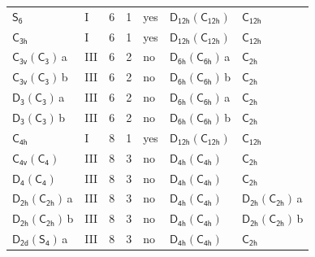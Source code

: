 \documentclass[10pt,a4paper]{article}
\numberwithin{equation}{section}
\newcommand{\grp}[1]{\mathsf{#1}}
\newcommand{\clsletter}[1]{\,{\scriptsize\color{black!55}#1}}
\begin{document}
{\begin{longtable}{@{}llrrlll@{}}
\href{../../../rotation/data/pdf/S6.pdf}{$\grp{S_{6}}$} & I & 6 & 1 & yes & \href{D12h-C12h.pdf}{$\grp{D_{12h}}(\grp{C_{12h}})$} & \href{../../../rotation/data/pdf/C12h.pdf}{$\grp{C_{12h}}$}\\
\href{../../../rotation/data/pdf/C3h.pdf}{$\grp{C_{3h}}$} & I & 6 & 1 & yes & \href{D12h-C12h.pdf}{$\grp{D_{12h}}(\grp{C_{12h}})$} & \href{../../../rotation/data/pdf/C12h.pdf}{$\grp{C_{12h}}$}\\
\href{C3v-C3.pdf}{$\grp{C_{3v}}(\grp{C_{3}})$}\clsletter{a} & III & 6 & 2 & no & \href{D6h-C6h.pdf}{$\grp{D_{6h}}(\grp{C_{6h}})$}\clsletter{a} & \href{../../../rotation/data/pdf/C2h.pdf}{$\grp{C_{2h}}$}\\
\href{C3v-C3.pdf}{$\grp{C_{3v}}(\grp{C_{3}})$}\clsletter{b} & III & 6 & 2 & no & \href{D6h-C6h.pdf}{$\grp{D_{6h}}(\grp{C_{6h}})$}\clsletter{b} & \href{../../../rotation/data/pdf/C2h.pdf}{$\grp{C_{2h}}$}\\
\href{D3-C3.pdf}{$\grp{D_{3}}(\grp{C_{3}})$}\clsletter{a} & III & 6 & 2 & no & \href{D6h-C6h.pdf}{$\grp{D_{6h}}(\grp{C_{6h}})$}\clsletter{a} & \href{../../../rotation/data/pdf/C2h.pdf}{$\grp{C_{2h}}$}\\
\href{D3-C3.pdf}{$\grp{D_{3}}(\grp{C_{3}})$}\clsletter{b} & III & 6 & 2 & no & \href{D6h-C6h.pdf}{$\grp{D_{6h}}(\grp{C_{6h}})$}\clsletter{b} & \href{../../../rotation/data/pdf/C2h.pdf}{$\grp{C_{2h}}$}\\
\href{../../../rotation/data/pdf/C4h.pdf}{$\grp{C_{4h}}$} & I & 8 & 1 & yes & \href{D12h-C12h.pdf}{$\grp{D_{12h}}(\grp{C_{12h}})$} & \href{../../../rotation/data/pdf/C12h.pdf}{$\grp{C_{12h}}$}\\
\href{C4v-C4.pdf}{$\grp{C_{4v}}(\grp{C_{4}})$} & III & 8 & 3 & no & \href{D4h-C4h.pdf}{$\grp{D_{4h}}(\grp{C_{4h}})$} & \href{../../../rotation/data/pdf/C2h.pdf}{$\grp{C_{2h}}$}\\
\href{D4-C4.pdf}{$\grp{D_{4}}(\grp{C_{4}})$} & III & 8 & 3 & no & \href{D4h-C4h.pdf}{$\grp{D_{4h}}(\grp{C_{4h}})$} & \href{../../../rotation/data/pdf/C2h.pdf}{$\grp{C_{2h}}$}\\
\href{D2h-C2h.pdf}{$\grp{D_{2h}}(\grp{C_{2h}})$}\clsletter{a} & III & 8 & 3 & no & \href{D4h-C4h.pdf}{$\grp{D_{4h}}(\grp{C_{4h}})$} & \href{D2h-C2h.pdf}{$\grp{D_{2h}}(\grp{C_{2h}})$}\clsletter{a}\\
\href{D2h-C2h.pdf}{$\grp{D_{2h}}(\grp{C_{2h}})$}\clsletter{b} & III & 8 & 3 & no & \href{D4h-C4h.pdf}{$\grp{D_{4h}}(\grp{C_{4h}})$} & \href{D2h-C2h.pdf}{$\grp{D_{2h}}(\grp{C_{2h}})$}\clsletter{b}\\
\href{D2d-S4.pdf}{$\grp{D_{2d}}(\grp{S_{4}})$}\clsletter{a} & III & 8 & 3 & no & \href{D4h-C4h.pdf}{$\grp{D_{4h}}(\grp{C_{4h}})$} & \href{../../../rotation/data/pdf/C2h.pdf}{$\grp{C_{2h}}$}\\

\end{longtable}}
\end{document}
